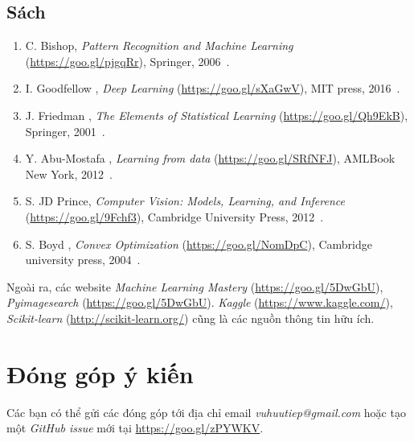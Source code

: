 \subsection{Sách}
\begin{enumerate}

\item  C. Bishop, \textit{Pattern Recognition and Machine
Learning} (\url{https://goo.gl/pjgqRr}), Springer,
2006~\cite{bishop2006pattern}.

\item I. Goodfellow \etal,
\textit{Deep Learning} (\url{https://goo.gl/sXaGwV}), MIT press,
2016~\cite{Goodfellow-et-al-2016}.

\item J. Friedman \etal, \textit{The Elements of Statistical
Learning} (\url{https://goo.gl/Qh9EkB}), Springer, 2001~\cite{friedman2001elements}.


\item Y. Abu-Mostafa \etal, \textit{Learning from data}
(\url{https://goo.gl/SRfNFJ}), AMLBook New York,
2012~\cite{abu2012learning}.

\item S. JD Prince, \textit{Computer Vision: Models, Learning, and
Inference} (\url{https://goo.gl/9Fchf3}), Cambridge University Press,
2012~\cite{prince2012computer}.

\item S. Boyd \etal, \textit{Convex Optimization}
(\url{https://goo.gl/NomDpC}), Cambridge university
press, 2004~\cite{boyd2004convex}.

\end{enumerate}
Ngoài ra, các website \textit{Machine Learning Mastery}
(\url{https://goo.gl/5DwGbU}), \textit{Pyimagesearch}
(\url{https://goo.gl/5DwGbU}). \textit{Kaggle} (\url{https://www.kaggle.com/}),
\textit{Scikit-learn} (\url{http://scikit-learn.org/}) cũng là các nguồn thông
tin hữu ích.

\section{Đóng góp ý kiến}
Các bạn có thể gửi các đóng góp tới địa chỉ email \textit{vuhuutiep@gmail.com}
hoặc tạo một \textit{GitHub issue} mới tại \url{https://goo.gl/zPYWKV}.


